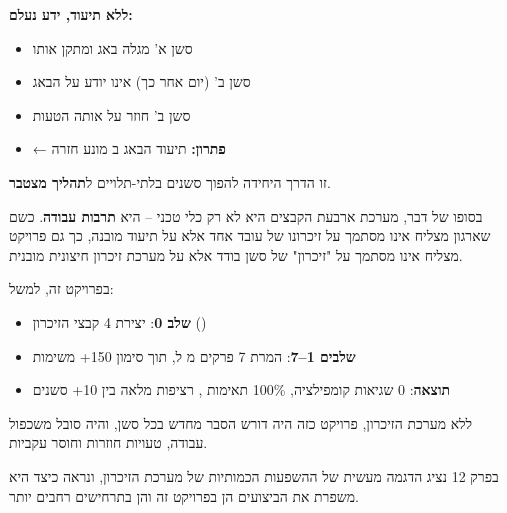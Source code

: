 \textbf{ללא תיעוד, ידע נעלם:}
\begin{itemize}
  \item סשן א' מגלה באג ומתקן אותו
  \item סשן ב' (יום אחר כך) אינו יודע על הבאג
  \item סשן ב' חוזר על אותה הטעות
  \item ← \textbf{פתרון:} תיעוד הבאג ב מונע חזרה
\end{itemize}

זו הדרך היחידה להפוך סשנים בלתי-תלויים ל\textbf{תהליך מצטבר}.


בסופו של דבר, מערכת ארבעת הקבצים היא לא רק כלי טכני – היא \textbf{תרבות עבודה}. כשם שארגון מצליח אינו מסתמך על זיכרונו של עובד אחד אלא על תיעוד מובנה, כך גם פרויקט  מצליח אינו מסתמך על "זיכרון" של סשן בודד אלא על מערכת זיכרון חיצונית מובנית.

בפרויקט זה, למשל:
\begin{itemize}
  \item \textbf{שלב \num{0}}: יצירת \num{4} קבצי הזיכרון ()
  \item \textbf{שלבים \num{1}–\num{7}}: המרת \num{7} פרקים מ ל, תוך סימון \num{150}+ משימות
  \item \textbf{תוצאה}: \num{0} שגיאות קומפילציה, \num{100}\% תאימות , רציפות מלאה בין \num{10}+ סשנים
\end{itemize}

ללא מערכת הזיכרון, פרויקט כזה היה דורש הסבר מחדש בכל סשן, והיה סובל משכפול עבודה, טעויות חוזרות וחוסר עקביות.

בפרק \num{12} נציג הדגמה מעשית של ההשפעות הכמותיות של מערכת הזיכרון, ונראה כיצד היא משפרת את הביצועים הן בפרויקט זה והן בתרחישים רחבים יותר.

